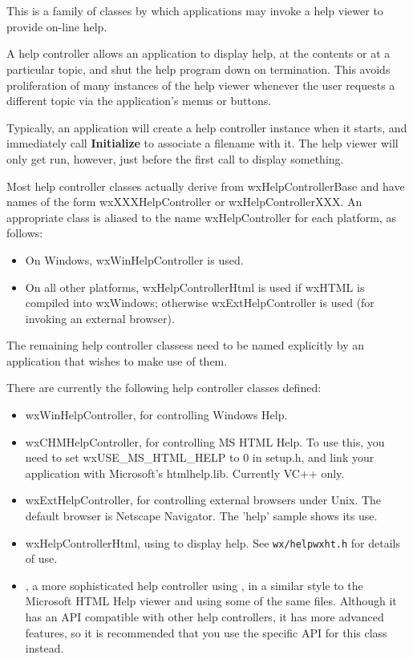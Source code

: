 \section{}\label{wxhelpcontroller}

This is a family of classes by which
applications may invoke a help viewer to provide on-line help.

A help controller allows an application to display help, at the contents
or at a particular topic, and shut the help program down on termination.
This avoids proliferation of many instances of the help viewer whenever the
user requests a different topic via the application's menus or buttons.

Typically, an application will create a help controller instance
when it starts, and immediately call {\bf Initialize}\rtfsp
to associate a filename with it. The help viewer will only get run, however,
just before the first call to display something.

Most help controller classes actually derive from wxHelpControllerBase and have
names of the form wxXXXHelpController or wxHelpControllerXXX. An
appropriate class is aliased to the name wxHelpController for each platform, as follows:

\begin{itemize}\itemsep=0pt
\item On Windows, wxWinHelpController is used.
\item On all other platforms, wxHelpControllerHtml is used if wxHTML is
compiled into wxWindows; otherwise wxExtHelpController is used (for invoking an external
browser).
\end{itemize}

The remaining help controller classess need to be named
explicitly by an application that wishes to make use of them.

There are currently the following help controller classes defined:

\begin{itemize}\itemsep=0pt
\item wxWinHelpController, for controlling Windows Help.
\item wxCHMHelpController, for controlling MS HTML Help. To use this, you need to set wxUSE\_MS\_HTML\_HELP
to 0 in setup.h, and link your application with Microsoft's htmlhelp.lib. Currently VC++ only.
\item wxExtHelpController, for controlling external browsers under Unix.
The default browser is Netscape Navigator. The 'help' sample shows its use.
\item wxHelpControllerHtml, using  to display help. See {\tt wx/helpwxht.h} for
details of use.
\item {}, a more sophisticated help controller using , in
a similar style to the Microsoft HTML Help viewer and using some of the same files.
Although it has an API compatible with other help controllers, it has more advanced features, so it is
recommended that you use the specific API for this class instead.
\end{itemize}

